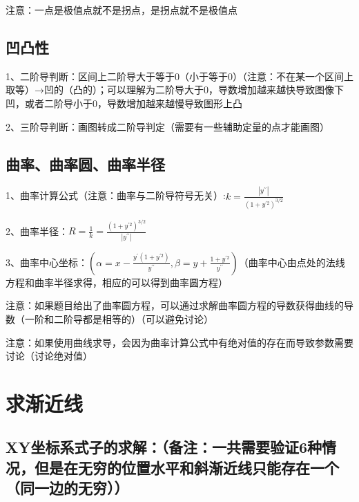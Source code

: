 注意：一点是极值点就不是拐点，是拐点就不是极值点



\subsection{凹凸性}

1、二阶导判断：区间上二阶导大于等于0（小于等于0）（注意：不在某一个区间上取等）→凹的（凸的）；可以理解为二阶导大于0，导数增加越来越快导致图像下凹，或者二阶导小于0，导数增加越来越慢导致图形上凸

2、三阶导判断：画图转成二阶导判定（需要有一些辅助定量的点才能画图）



\subsection{曲率、曲率圆、曲率半径}

1、曲率计算公式（注意：曲率与二阶导符号无关）:$k=\frac{\left|y^{\prime \prime}\right|}{\left(1+y^{\prime 2}\right)^{3 / 2}}$

2、曲率半径：$R=\frac{1}{k}=\frac{\left(1+y^{\prime 2}\right)^{3 / 2}}{\left|y^{\prime \prime}\right|}$

3、曲率中心坐标：$(\alpha=x-\frac{y^{\prime}\left(1+y^{\prime 2}\right)}{y^{\prime \prime}}, \beta=y+\frac{1+y^{\prime 2}}{y^{\prime \prime}})$（曲率中心由点处的法线方程和曲率半径求得，相应的可以得到曲率圆方程）

注意：如果题目给出了曲率圆方程，可以通过求解曲率圆方程的导数获得曲线的导数（一阶和二阶导都是相等的）（可以避免讨论）

注意：如果使用曲线求导，会因为曲率计算公式中有绝对值的存在而导致参数需要讨论（讨论绝对值）



\section{求渐近线}



\subsection{XY坐标系式子的求解：（备注：一共需要验证6种情况，但是在无穷的位置水平和斜渐近线只能存在一个（同一边的无穷））}

